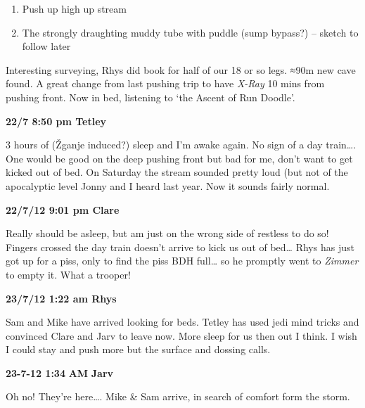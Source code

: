\begin{enumerate}
\def\labelenumi{\arabic{enumi}.}
\tightlist
\item
  Push up high up stream
\item
  The strongly draughting muddy tube with puddle (sump bypass?) --
  sketch to follow later
\end{enumerate}

Interesting surveying, Rhys did book for half of our 18 or so legs. ≈90m
new cave found. A great change from last pushing trip to have
\emph{X-Ray} 10 mins from pushing front. Now in bed, listening to `the
Ascent of Run Doodle'.

\textbf{22/7 8:50 pm Tetley}

3 hours of (Žganje induced?) sleep and I'm awake again. No sign of a day
train\ldots{}. One would be good on the deep pushing front but bad for
me, don't want to get kicked out of bed. On Saturday the stream sounded
pretty loud (but not of the apocalyptic level Jonny and I heard last
year. Now it sounds fairly normal.

\textbf{22/7/12 9:01 pm Clare}

Really should be asleep, but am just on the wrong side of restless to do
so! Fingers crossed the day train doesn't arrive to kick us out of
bed\ldots{} Rhys has just got up for a piss, only to find the piss BDH
full\ldots{} so he promptly went to \emph{Zimmer} to empty it. What a
trooper!

\textbf{23/7/12 1:22 am Rhys}

Sam and Mike have arrived looking for beds. Tetley has used jedi mind
tricks and convinced Clare and Jarv to leave now. More sleep for us then
out I think. I wish I could stay and push more but the surface and
dossing calls.

\textbf{23-7-12 1:34} \textbf{AM} \textbf{Jarv}

Oh no! They're here\ldots{}. Mike \& Sam arrive, in search of comfort
form the storm.

